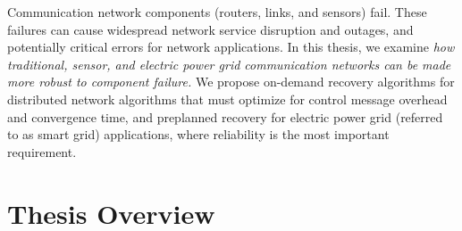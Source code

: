

Communication network components (routers, links, and sensors) fail. %
These failures can cause widespread network service disruption and outages, and potentially critical errors for network applications.
In this thesis, we examine \textit{how traditional, sensor, and electric power grid communication networks can be made more robust to component failure.}
We propose on-demand recovery algorithms for distributed network algorithms that must optimize for control message overhead and convergence time,
and preplanned recovery for electric power grid (referred to as smart grid) applications, where reliability is the most important requirement.




\section{Thesis Overview}

